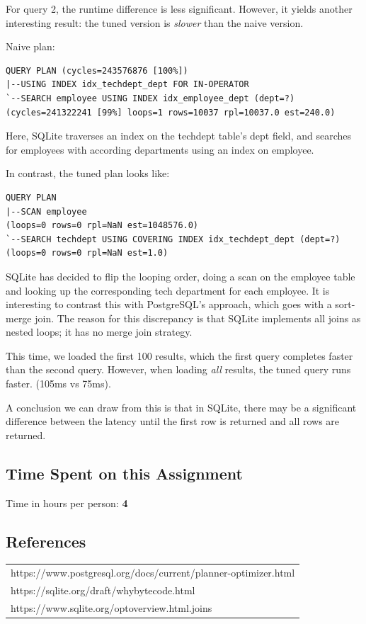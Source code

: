 \documentclass[11pt]{scrartcl}
\begin{document}
For query 2, the runtime difference is less significant.  However, it yields another interesting result: the tuned version is \textit{slower} than the naive version.

Naive plan:

{\small
\parskip0pt\begin{verbatim}
QUERY PLAN (cycles=243576876 [100%])
|--USING INDEX idx_techdept_dept FOR IN-OPERATOR
`--SEARCH employee USING INDEX idx_employee_dept (dept=?)     (cycles=241322241 [99%] loops=1 rows=10037 rpl=10037.0 est=240.0)
\end{verbatim}}

Here, SQLite traverses an index on the techdept table's dept field, and searches for employees with according departments using an index on employee.

In contrast, the tuned plan looks like:

{\small
\parskip0pt\begin{verbatim}
QUERY PLAN
|--SCAN employee                                                       (loops=0 rows=0 rpl=NaN est=1048576.0)
`--SEARCH techdept USING COVERING INDEX idx_techdept_dept (dept=?)     (loops=0 rows=0 rpl=NaN est=1.0)
\end{verbatim}}

SQLite has decided to flip the looping order, doing a scan on the employee table and looking up the corresponding tech department for each employee.  It is interesting to contrast this with PostgreSQL's approach, which goes with a sort-merge join.  The reason for this discrepancy is that SQLite implements all joins as nested loops; it has no merge join strategy.

This time, we loaded the first 100 results, which the first query completes faster than the second query.  However, when loading \textit{all} results, the tuned query runs faster. (105ms vs 75ms).

A conclusion we can draw from this is that in SQLite, there may be a significant difference between the latency until the first row is returned and all rows are returned.

\subsection*{Time Spent on this Assignment}

Time in hours per person: \textbf{4}

\subsection*{References}

\begin{table}[H]
  \centering
  \begin{tabular}{l}
    \hline
    https://www.postgresql.org/docs/current/planner-optimizer.html \tabularnewline
    https://sqlite.org/draft/whybytecode.html \tabularnewline
    https://www.sqlite.org/optoverview.html.joins \tabularnewline
    \hline
  \end{tabular}
\end{table}
\end{document}
